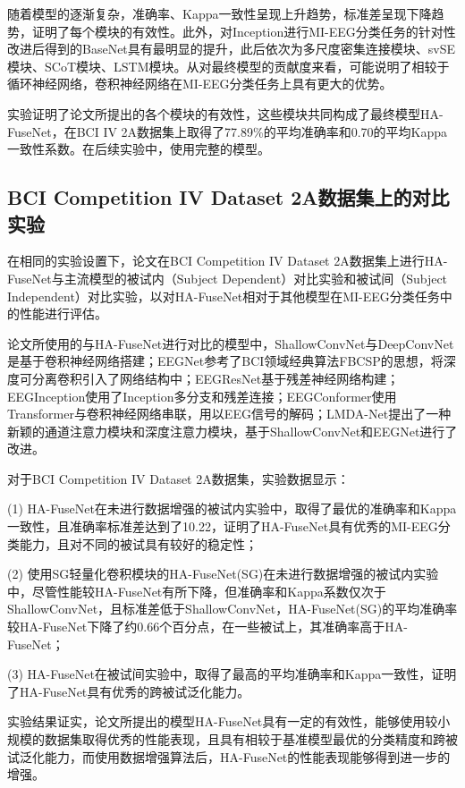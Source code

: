 随着模型的逐渐复杂，准确率、Kappa一致性呈现上升趋势，标准差呈现下降趋势，证明了每个模块的有效性。此外，对Inception进行MI-EEG分类任务的针对性改进后得到的BaseNet具有最明显的提升，此后依次为多尺度密集连接模块、svSE模块、SCoT模块、LSTM模块。从对最终模型的贡献度来看，可能说明了相较于循环神经网络，卷积神经网络在MI-EEG分类任务上具有更大的优势。

实验证明了论文所提出的各个模块的有效性，这些模块共同构成了最终模型HA-FuseNet，在BCI IV 2A数据集上取得了77.89\%的平均准确率和0.70的平均Kappa一致性系数。在后续实验中，使用完整的模型。

\subsection{BCI Competition IV Dataset 2A数据集上的对比实验}

在相同的实验设置下，论文在BCI Competition IV Dataset 2A数据集上进行HA-FuseNet与主流模型的被试内（Subject Dependent）对比实验和被试间（Subject Independent）对比实验，以对HA-FuseNet相对于其他模型在MI-EEG分类任务中的性能进行评估。

论文所使用的与HA-FuseNet进行对比的模型中，ShallowConvNet\cite{schirrmeister2017deep}与DeepConvNet\cite{schirrmeister2017deep}是基于卷积神经网络搭建；EEGNet\cite{lawhern2018eegnet}参考了BCI领域经典算法FBCSP的思想，将深度可分离卷积引入了网络结构中；EEGResNet\cite{HBM:HBM23730}基于残差神经网络\cite{he2016deep}构建；EEGInception\cite{zhang2021eeg}使用了Inception多分支和残差连接；EEGConformer\cite{song2022eeg}使用Transformer\cite{vaswani2017attention}与卷积神经网络串联，用以EEG信号的解码；LMDA-Net\cite{miao2023lmda}提出了一种新颖的通道注意力模块和深度注意力模块，基于ShallowConvNet和EEGNet进行了改进。

对于BCI Competition IV Dataset 2A数据集，实验数据显示：

(1) HA-FuseNet在未进行数据增强的被试内实验中，取得了最优的准确率和Kappa一致性，且准确率标准差达到了10.22，证明了HA-FuseNet具有优秀的MI-EEG分类能力，且对不同的被试具有较好的稳定性；

(2) 使用SG轻量化卷积模块的HA-FuseNet(SG)在未进行数据增强的被试内实验中，尽管性能较HA-FuseNet有所下降，但准确率和Kappa系数仅次于ShallowConvNet，且标准差低于ShallowConvNet，HA-FuseNet(SG)的平均准确率较HA-FuseNet下降了约0.66个百分点，在一些被试上，其准确率高于HA-FuseNet；

(3) HA-FuseNet在被试间实验中，取得了最高的平均准确率和Kappa一致性，证明了HA-FuseNet具有优秀的跨被试泛化能力。

实验结果证实，论文所提出的模型HA-FuseNet具有一定的有效性，能够使用较小规模的数据集取得优秀的性能表现，且具有相较于基准模型最优的分类精度和跨被试泛化能力，而使用数据增强算法后，HA-FuseNet的性能表现能够得到进一步的增强。

